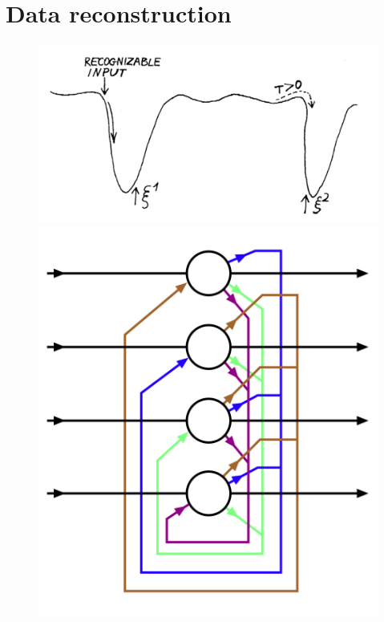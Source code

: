 \documentclass[12pt]{article}
\numberwithin{equation}{section}
\begin{document}
\section*{Data reconstruction}
\begin{figure}[h!]
  \centering
  \begin{minipage}{0.69\textwidth}
    \centering
    \includegraphics[width=1.0\textwidth]{./images/hopfield-energy-plot.png} %
\end{minipage}\hfill
  \begin{minipage}{0.29\textwidth}
      \centering
      \includegraphics[width=1.0\textwidth]{./images/Hopfield-net-vector.png} %
  \end{minipage}
\end{figure}
\end{document}
